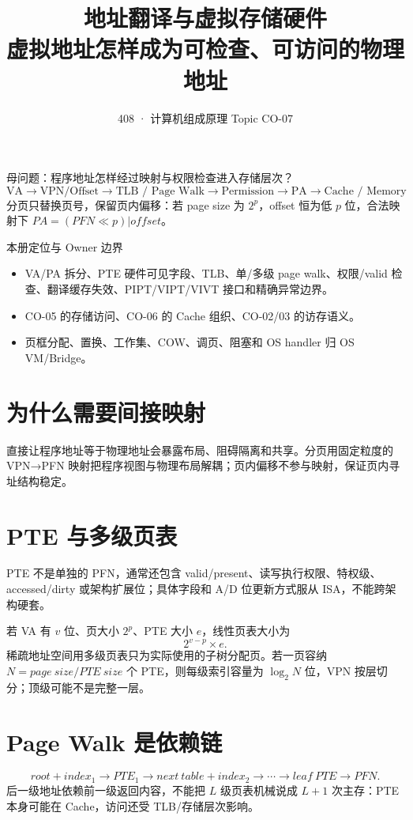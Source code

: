 \documentclass[UTF8,fontset=fandol,11pt,a4paper]{ctexart}
\title{\vspace{-1.1cm}\textbf{地址翻译与虚拟存储硬件}\\[0.4em]\large 虚拟地址怎样成为可检查、可访问的物理地址}\author{408 · 计算机组成原理 Topic CO-07}\date{}
\begin{document}
\maketitle
\begin{corebox}{母问题：程序地址怎样经过映射与权限检查进入存储层次？}
\[
\boxed{\text{VA}\to\text{VPN/Offset}\to\text{TLB / Page Walk}\to\text{Permission}\to\text{PA}\to\text{Cache / Memory}}
\]
分页只替换页号，保留页内偏移：若 page size 为 $2^p$，offset 恒为低 $p$ 位，合法映射下 $PA=(PFN\ll p)|offset$。
\end{corebox}
\begin{methodbox}{本册定位与 Owner 边界}\begin{itemize}\item {}VA/PA 拆分、PTE 硬件可见字段、TLB、单/多级 page walk、权限/valid 检查、翻译缓存失效、PIPT/VIPT/VIVT 接口和精确异常边界。\item {}CO-05 的存储访问、CO-06 的 Cache 组织、CO-02/03 的访存语义。\item {}页框分配、置换、工作集、COW、调页、阻塞和 OS handler 归 OS VM/Bridge。\end{itemize}\end{methodbox}\tableofcontents\newpage
\section{为什么需要间接映射}
直接让程序地址等于物理地址会暴露布局、阻碍隔离和共享。分页用固定粒度的 VPN→PFN 映射把程序视图与物理布局解耦；页内偏移不参与映射，保证页内寻址结构稳定。

\section{PTE 与多级页表}
PTE 不是单独的 PFN，通常还包含 valid/present、读写执行权限、特权级、accessed/dirty 或架构扩展位；具体字段和 A/D 位更新方式服从 ISA，不能跨架构硬套。

若 VA 有 $v$ 位、页大小 $2^p$、PTE 大小 $e$，线性页表大小为
\[
2^{v-p}\times e.
\]
稀疏地址空间用多级页表只为实际使用的子树分配页。若一页容纳 $N=page\ size/PTE\ size$ 个 PTE，则每级索引容量为 $\log_2N$ 位，VPN 按层切分；顶级可能不是完整一层。

\section{Page Walk 是依赖链}
\[
root+index_1\to PTE_1\to next\ table+index_2\to\cdots\to leaf\ PTE\to PFN.
\]
后一级地址依赖前一级返回内容，不能把 $L$ 级页表机械说成 $L+1$ 次主存：PTE 本身可能在 Cache，访问还受 TLB/存储层次影响。
\end{document}
